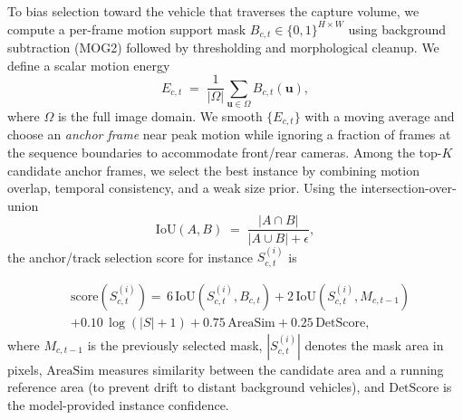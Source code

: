 \documentclass[letterpaper, 10 pt, conference]{ieeeconf}  %
\begin{document}
To bias selection toward the vehicle that traverses the capture volume, we compute a per-frame motion support mask $B_{c,t}\in\{0,1\}^{H\times W}$ using background subtraction (MOG2) \cite{zivkovic2004improved} followed by thresholding and morphological cleanup. We define a scalar motion energy
\begin{equation}
E_{c,t} \;=\; \frac{1}{|\Omega|}\sum_{\mathbf{u}\in\Omega} B_{c,t}(\mathbf{u}),
\label{eq:motion_energy}
\end{equation}
where $\Omega$ is the full image domain. We smooth $\{E_{c,t}\}$ with a moving average and choose an \emph{anchor frame} near peak motion while ignoring a fraction of frames at the sequence boundaries to accommodate front/rear cameras. Among the top-$K$ candidate anchor frames, we select the best instance by combining motion overlap, temporal consistency, and a weak size prior. Using the intersection-over-union
\begin{equation}
\mathrm{IoU}(A,B) \;=\; \frac{|A\cap B|}{|A\cup B|+\epsilon},
\label{eq:iou}
\end{equation}
the anchor/track selection score for instance $S_{c,t}^{(i)}$ is


\vspace{-1em}

\begin{equation}
\begin{split}
&\mathrm{score}\!\left(S_{c,t}^{(i)}\right) =
\,6\,\mathrm{IoU}\!\left(S_{c,t}^{(i)}, B_{c,t}\right)
+2\,\mathrm{IoU}\!\left(S_{c,t}^{(i)}, M_{c,t-1}\right) \\
&+0.10\,\log(|S|+1)
+0.75\,\mathrm{AreaSim}
+0.25\,\mathrm{DetScore},
\end{split}
\label{eq:sam_score}
\end{equation}
where $M_{c,t-1}$ is the previously selected mask, $|S_{c,t}^{(i)}|$ denotes the mask area in pixels, $\mathrm{AreaSim}$ measures similarity between the candidate area and a running reference area (to prevent drift to distant background vehicles), and $\mathrm{DetScore}$ is the model-provided instance confidence.

\end{document}

